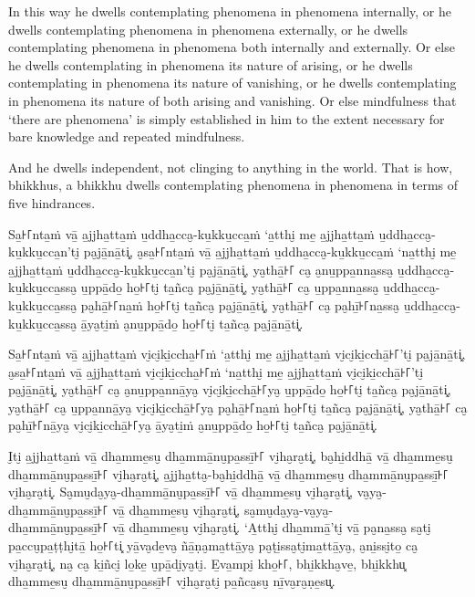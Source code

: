 In this way he dwells contemplating phenomena in phenomena internally, or he
dwells contemplating phenomena in phenomena externally, or he dwells
contemplating phenomena in phenomena both internally and externally. Or else he
dwells contemplating in phenomena its nature of arising, or he dwells
contemplating in phenomena its nature of vanishing, or he dwells contemplating
in phenomena its nature of both arising and vanishing. Or else mindfulness that
‘there are phenomena’ is simply established in him to the extent necessary for
bare knowledge and repeated mindfulness.

And he dwells independent, not clinging to anything in the world. That is how,
bhikkhus, a bhikkhu dwells contemplating phenomena in phenomena in terms of five
hindrances.


\paliPage

Sa̱꜔꜒nta̱ṁ vā̱ a̱jjha̱tta̱ṁ u̱ddha̱cca̮-ku̱kku̱cca̱ṁ ‘a̱tthi̮ me̱ a̱jjha̱tta̱ṁ u̱ddha̱cca̮-ku̱kku̱cca̱n’ti̮ pa̮jā̱nā̱ti͓,
a̮sa̱꜔꜒nta̱ṁ vā̱ a̱jjha̱tta̱ṁ u̱ddha̱cca̮-ku̱kku̱cca̱ṁ ‘na̱tthi̮ me̱ a̱jjha̱tta̱ṁ u̱ddha̱cca̮-ku̱kku̱cca̱n’ti̮ pa̮jā̱nā̱ti͓,
ya̮thā̱꜔꜒ ca̮ a̮nu̱ppa̱nna̱ssa̮ u̱ddha̱cca̮-ku̱kku̱cca̱ssa̮ u̱ppā̱do̱ ho̱꜔꜒ti̮ ta̱ñca̮ pa̮jā̱nā̱ti͓,
ya̮thā̱꜔꜒ ca̮ u̱ppa̱nna̱ssa̮ u̱ddha̱cca̮-ku̱kku̱cca̱ssa̮ pa̮hā̱꜔꜒na̱ṁ ho̱꜔꜒ti̮ ta̱ñca̮ pa̮jā̱nā̱ti͓,
ya̮thā̱꜔꜒ ca̮ pa̮hī̱꜔꜒na̱ssa̮ u̱ddha̱cca̮-ku̱kku̱cca̱ssa̮ ā̱ya̮ti̱ṁ a̮nu̱ppā̱do̱ ho̱꜔꜒ti̮ ta̱ñca̮ pa̮jā̱nā̱ti͓.

Sa̱꜔꜒nta̱ṁ vā̱ a̱jjha̱tta̱ṁ vi̮ci̮ki̱ccha̱꜔꜒ṁ ‘a̱tthi̮ me̱ a̱jjha̱tta̱ṁ vi̮ci̮ki̱cchā̱꜔꜒’ti̮ pa̮jā̱nā̱ti͓,
a̮sa̱꜔꜒nta̱ṁ vā̱ a̱jjha̱tta̱ṁ vi̮ci̮ki̱ccha̱꜔꜒ṁ ‘na̱tthi̮ me̱ a̱jjha̱tta̱ṁ vi̮ci̮ki̱cchā̱꜔꜒’ti̮ pa̮jā̱nā̱ti͓,
ya̮thā̱꜔꜒ ca̮ a̮nu̱ppa̱nnā̱ya̮ vi̮ci̮ki̱cchā̱꜔꜒ya̮ u̱ppā̱do̱ ho̱꜔꜒ti̮ ta̱ñca̮ pa̮jā̱nā̱ti͓,
ya̮thā̱꜔꜒ ca̮ u̱ppa̱nnā̱ya̮ vi̮ci̮ki̱cchā̱꜔꜒ya̮ pa̮hā̱꜔꜒na̱ṁ ho̱꜔꜒ti̮ ta̱ñca̮ pa̮jā̱nā̱ti͓,
ya̮thā̱꜔꜒ ca̮ pa̮hī̱꜔꜒nā̱ya̮ vi̮ci̮ki̱cchā̱꜔꜒ya̮ ā̱ya̮ti̱ṁ a̮nu̱ppā̱do̱ ho̱꜔꜒ti̮ ta̱ñca̮ pa̮jā̱nā̱ti͓.

I̮ti̮ a̱jjha̱tta̱ṁ vā̱ dha̱mme̱su̮ dha̱mmā̱nu̮pa̱ssī̱꜔꜒ vi̮ha̮ra̮ti͓,
ba̮hi̱ddhā̱ vā̱ dha̱mme̱su̮ dha̱mmā̱nu̮pa̱ssī̱꜔꜒ vi̮ha̮ra̮ti͓,
a̱jjha̱tta̮-ba̮hi̱ddhā̱ vā̱ dha̱mme̱su̮ dha̱mmā̱nu̮pa̱ssī̱꜔꜒ vi̮ha̮ra̮ti͓.
Sa̮mu̮da̮ya̮-dha̱mmā̱nu̮pa̱ssī̱꜔꜒ vā̱ dha̱mme̱su̮ vi̮ha̮ra̮ti͓,
va̮ya̮-dha̱mmā̱nu̮pa̱ssī̱꜔꜒ vā̱ dha̱mme̱su̮ vi̮ha̮ra̮ti͓,
sa̮mu̮da̮ya̮-va̮ya̮-\\ dha̱mmā̱nu̮pa̱ssī̱꜔꜒ vā̱ dha̱mme̱su̮ vi̮ha̮ra̮ti͓.
‘A̱tthi̮ dha̱mmā̱’ti̮ vā̱ pa̮na̱ssa̮ sa̮ti̮ pa̱ccu̮pa̱ṭṭhi̮tā̱ ho̱꜔꜒ti͓
yā̱va̮de̱va̮ ñā̱ṇa̮ma̱ttā̱ya̮ pa̮ṭi̱ssa̮ti̮ma̱ttā̱ya̮, a̮ni̱ssi̮to̱ ca̮ vi̮ha̮ra̮ti͓,
na̮ ca̮ ki̱ñci̮ lo̱ke̱ u̮pā̱di̮ya̮ti̮. E̱va̱mpi̮ kho̱꜔꜒, bhi̱kkha̮ve̱, bhi̱kkhu͓
dha̱mme̱su̮ dha̱mmā̱nu̮pa̱ssī̱꜔꜒ vi̮ha̮ra̮ti̮ pa̱ñca̮su̮ nī̱va̮ra̮ṇe̱su͓.

